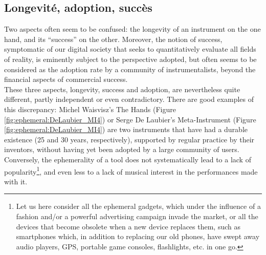 \subsection{Longevité, adoption, succès}
Two aspects often seem to be confused: the longevity of an instrument on the one hand, and its “success” on the other. Moreover, the notion of success, symptomatic of our digital society that seeks to quantitatively evaluate all fields of reality, is eminently subject to the perspective adopted, but often seems to be considered as the adoption rate by a community of instrumentalists, beyond the financial aspects of commercial success.\\
\indent These three aspects, longevity, success and adoption, are nevertheless quite different, partly independent or even contradictory. There are good examples of this discrepancy: Michel Waisvisz's The Hands \cite{torre_hands:_2016} (Figure \ref{fig:ephemeral:DeLaubier_MI4}) or Serge De Laubier's Meta-Instrument \cite{couprie_meta-instrument:_2018} (Figure \ref{fig:ephemeral:DeLaubier_MI4}) are two instruments that have had a durable existence (25 and 30 years, respectively), supported by regular practice by their inventors, without having yet been adopted by a large community of users. Conversely, the ephemerality of a tool does not systematically lead to a lack of popularity\footnote{Let us here consider all the ephemeral gadgets, which under the influence of a fashion and/or a powerful advertising campaign invade the market, or all the devices that become obsolete when a new device replaces them, such as smartphones which, in addition to replacing our old phones, have swept away audio players, GPS, portable game consoles, flashlights, etc. in one go.}, and even less to a lack of musical interest in the performances made with it.\\

